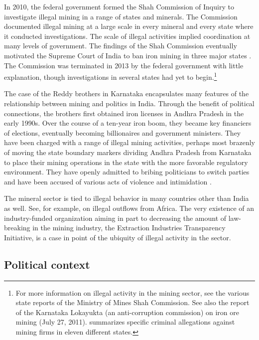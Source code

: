 \documentclass[12pt,letterpaper]{article}
\begin{document}
In 2010, the federal government formed the Shah Commission of Inquiry
to investigate illegal mining in a range of states and minerals. The
Commission documented illegal mining at a large scale in every mineral
and every state where it conducted investigations. The scale of
illegal activities implied coordination at many levels of
government. The findings of the Shah Commission eventually motivated
the Supreme Court of India to ban iron mining in three major states
\cite{wsj2013chat}. The Commission was terminated in 2013 by the
federal government with little explanation, though investigations
in several states had yet to begin.\footnote{For more information on
  illegal activity in the mining sector, see the various state reports
  of the Ministry of Mines Shah Commission. See also the report of the
  Karnataka Lokayukta (an anti-corruption commission) on iron ore
  mining (July 27, 2011).  summarizes specific
  criminal allegations against mining firms in eleven different
  states.}

The case of the Reddy brothers in Karnataka encapsulates many features
of the relationship between mining and politics in India. Through
the benefit of political connections, the brothers first obtained iron
licenses in Andhra Pradesh in the early 1990s. Over the course of a
ten-year iron boom, they became key financiers of elections, eventually
becoming billionaires and government ministers. They have been charged
with a range of illegal mining activities, perhaps most brazenly of
moving the state boundary markers dividing Andhra Pradesh from
Karnataka to place their mining operations in the state with the more
favorable regulatory environment. They have openly admitted to bribing
politicians to switch parties and have been accused of various acts
of violence and intimidation \cite{Vaishnav2017}.

The mineral sector is tied to illegal behavior in many countries other
than India as well. See, for example,  on
illegal outflows from Africa. The very existence of an industry-funded
organization aiming in part to decreasing the amount of law-breaking
in the mining industry, the Extraction Industries Transparency
Initiative, is a case in point of the ubiquity of illegal activity in
the sector.

\subsection{Political context}
\label{ssec:politics}
\end{document}
